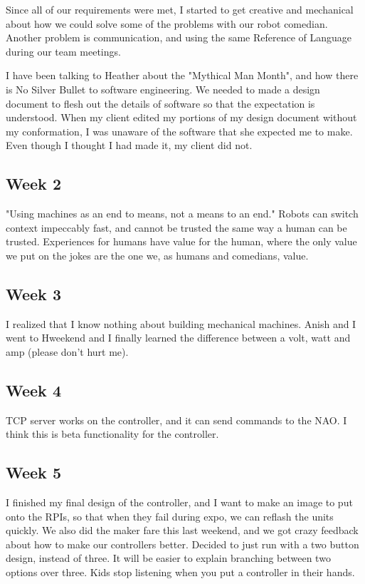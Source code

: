 \documentclass[onecolumn, draftclsnofoot,10pt, compsoc]{IEEEtran}
\begin{document}
Since all of our requirements were met, I started to get creative and mechanical about how we could solve some of the problems with our robot comedian. Another problem is communication, and using the same Reference of Language during our team meetings.

I have been talking to Heather about the "Mythical Man Month", and how there is No Silver Bullet to software engineering. We needed to made a design document to flesh out the details of software so that the expectation is understood. When my client edited my portions of my design document without my conformation, I was unaware of the software that she expected me to make. Even though I thought I had made it, my client did not.

\subsection{Week 2} "Using machines as an end to means, not a means to an end." Robots can switch context impeccably fast, and cannot be trusted the same way a human can be trusted. Experiences for humans have value for the human, where the only value we put on the jokes are the one we, as humans and comedians, value.

\subsection{Week 3} I realized that I know nothing about building mechanical machines. Anish and I went to Hweekend and I finally learned the difference between a volt, watt and amp (please don't hurt me).

\subsection{Week 4} TCP server works on the controller, and it can send commands to the NAO. I think this is beta functionality for the controller.

\subsection{Week 5} I finished my final design of the controller, and I want to make an image to put onto the RPIs, so that when they fail during expo, we can reflash the units quickly. We also did the maker fare this last weekend, and we got crazy feedback about how to make our controllers better. Decided to just run with a two button design, instead of three. It will be easier to explain branching between two options over three. Kids stop listening when you put a controller in their hands.
\end{document}
